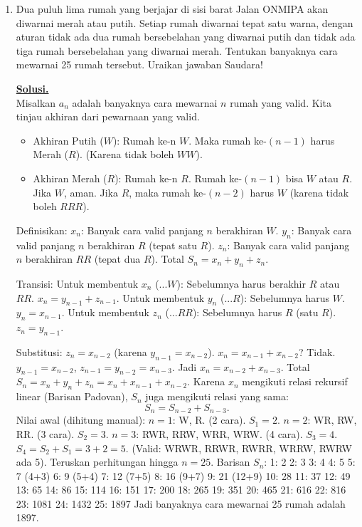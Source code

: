 \documentclass[12pt,twoside]{article}
\newenvironment{solution}
{
	\par\noindent\textbf{\underline{Solusi.}}\\
}
{
	\par
}
\begin{document}
\begin{enumerate}
  \item Dua puluh lima rumah yang berjajar di sisi barat Jalan ONMIPA akan diwarnai merah atau putih.
        Setiap rumah diwarnai tepat satu warna, dengan aturan tidak ada dua rumah bersebelahan yang diwarnai putih dan tidak ada tiga rumah bersebelahan yang diwarnai merah.
        Tentukan banyaknya cara mewarnai 25 rumah tersebut.
        Uraikan jawaban Saudara!
        \begin{solution}
          Misalkan $a_n$ adalah banyaknya cara mewarnai $n$ rumah yang valid.
          Kita tinjau akhiran dari pewarnaan yang valid.
          \begin{itemize}
            \item Akhiran Putih ($W$): Rumah ke-n $W$. Maka rumah ke-$(n-1)$ harus Merah ($R$). (Karena tidak boleh $WW$).
            \item Akhiran Merah ($R$): Rumah ke-n $R$. Rumah ke-$(n-1)$ bisa $W$ atau $R$.
                  Jika $W$, aman. Jika $R$, maka rumah ke-$(n-2)$ harus $W$ (karena tidak boleh $RRR$).
          \end{itemize}
          Definisikan:
          $x_n$: Banyak cara valid panjang $n$ berakhiran $W$.
          $y_n$: Banyak cara valid panjang $n$ berakhiran $R$ (tepat satu $R$).
          $z_n$: Banyak cara valid panjang $n$ berakhiran $RR$ (tepat dua $R$).
          Total $S_n = x_n + y_n + z_n$.

          Transisi:
          Untuk membentuk $x_n$ ($...W$): Sebelumnya harus berakhir $R$ atau $RR$.
          $x_n = y_{n-1} + z_{n-1}$.
          Untuk membentuk $y_n$ ($...R$): Sebelumnya harus $W$.
          $y_n = x_{n-1}$.
          Untuk membentuk $z_n$ ($...RR$): Sebelumnya harus $R$ (satu $R$).
          $z_n = y_{n-1}$.

          Substitusi:
          $z_n = x_{n-2}$ (karena $y_{n-1} = x_{n-2}$).
          $x_n = x_{n-1} + x_{n-2}$? Tidak. $y_{n-1} = x_{n-2}$, $z_{n-1} = y_{n-2} = x_{n-3}$.
          Jadi $x_n = x_{n-2} + x_{n-3}$.
          Total $S_n = x_n + y_n + z_n = x_n + x_{n-1} + x_{n-2}$.
          Karena $x_n$ mengikuti relasi rekursif linear (Barisan Padovan), $S_n$ juga mengikuti relasi yang sama:
          \[ S_n = S_{n-2} + S_{n-3}. \]
          Nilai awal (dihitung manual):
          $n=1$: W, R. (2 cara). $S_1=2$.
          $n=2$: WR, RW, RR. (3 cara). $S_2=3$.
          $n=3$: RWR, RRW, WRR, WRW. (4 cara). $S_3=4$.
          $S_4 = S_2 + S_1 = 3 + 2 = 5$. (Valid: WRWR, RRWR, RWRR, WRRW, RWRW ada 5).
          Teruskan perhitungan hingga $n=25$.
          Barisan $S_n$:
          1: 2
          2: 3
          3: 4
          4: 5
          5: 7 (4+3)
          6: 9 (5+4)
          7: 12 (7+5)
          8: 16 (9+7)
          9: 21 (12+9)
          10: 28
          11: 37
          12: 49
          13: 65
          14: 86
          15: 114
          16: 151
          17: 200
          18: 265
          19: 351
          20: 465
          21: 616
          22: 816
          23: 1081
          24: 1432
          25: 1897
          Jadi banyaknya cara mewarnai 25 rumah adalah 1897.
        \end{solution}
\end{enumerate}
\end{document}
